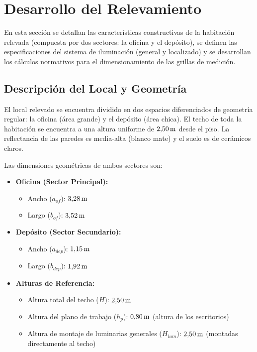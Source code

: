 \chapter{Desarrollo del Relevamiento}
\label{sec.tp2:desarrollo}

En esta sección se detallan las características constructivas de la habitación relevada (compuesta por dos sectores: la
oficina y el depósito), se definen las especificaciones del sistema de iluminación (general y localizado) y se
desarrollan los cálculos normativos para el dimensionamiento de las grillas de medición.

\section{Descripción del Local y Geometría}
\label{sec.tp2:descripcion_local}

El local relevado se encuentra dividido en dos espacios diferenciados de geometría regular: la oficina (área grande) y
el depósito (área chica). El techo de toda la habitación se encuentra a una altura uniforme de $2{,}50\,\mathrm{m}$ desde el
piso. La reflectancia de las paredes es media-alta (blanco mate) y el suelo es de cerámicos claros.

Las dimensiones geométricas de ambos sectores son:
\begin{itemize}
    \item \textbf{Oficina (Sector Principal):}
    \begin{itemize}
        \item Ancho ($a_{of}$): $3{,}28\,\mathrm{m}$
        \item Largo ($b_{of}$): $3{,}52\,\mathrm{m}$
    \end{itemize}
    \item \textbf{Depósito (Sector Secundario):}
    \begin{itemize}
        \item Ancho ($a_{dep}$): $1{,}15\,\mathrm{m}$
        \item Largo ($b_{dep}$): $1{,}92\,\mathrm{m}$
    \end{itemize}
    \item \textbf{Alturas de Referencia:}
    \begin{itemize}
        \item Altura total del techo ($H$): $2{,}50\,\mathrm{m}$
        \item Altura del plano de trabajo ($h_p$): $0{,}80\,\mathrm{m}$ (altura de los escritorios)
        \item Altura de montaje de luminarias generales ($H_{lum}$): $2{,}50\,\mathrm{m}$ (montadas directamente al techo)
    \end{itemize}
\end{itemize}

